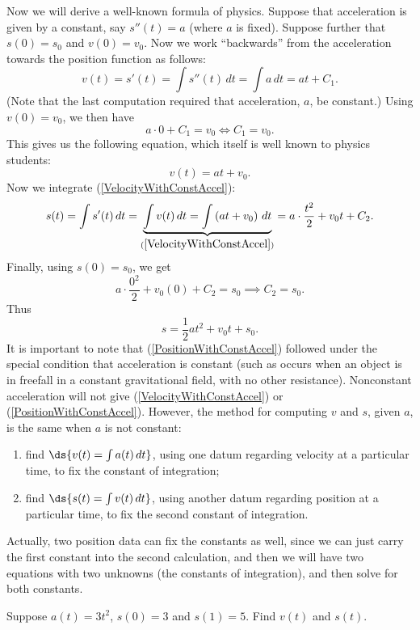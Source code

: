 Now we will derive a well-known formula of physics.
\bex Suppose that acceleration is given by a constant, 
say $s''(t)=a$ (where $a$ is fixed).  Suppose further
that $s(0)=s_0$ and $v(0)=v_0$.  Now we work ``backwards''
from the acceleration towards the position function as
follows:
$$v(t)=s'(t)=\int s''(t)\,dt=\int a\,dt=at+C_1.$$
(Note that the last computation required that acceleration, $a$, be constant.)
Using $v(0)=v_0$, we then have 
$$a\cdot0+C_1=v_0\iff C_1=v_0.$$
This gives us the following equation, which itself is well known
to physics students:
\begin{equation}v(t)=at+v_0.\label{VelocityWithConstAccel}\end{equation}
Now we integrate (\ref{VelocityWithConstAccel}):
$$s(t)=\int s'(t)\,dt=
\underbrace{\int v(t)\,dt=\int\left(at+v_0\right)\,dt}_{
(\ref{VelocityWithConstAccel})}
=a\cdot\frac{t^2}2+v_0t+C_2.$$
Finally, using $s(0)=s_0$, we get
$$a\cdot\frac{0^2}2+v_0(0)+C_2=s_0\implies C_2=s_0.$$
Thus
\begin{equation}s=\frac12at^2+v_0t+s_0.\label{PositionWithConstAccel}
\end{equation}
\eex
It is important to note that (\ref{PositionWithConstAccel})
followed under the special condition that acceleration is 
constant (such as occurs when an object is
in freefall in a constant gravitational field, with no other 
resistance).  Nonconstant acceleration will not give
(\ref{VelocityWithConstAccel}) or (\ref{PositionWithConstAccel}).
However, the method for computing $v$ and $s$, given $a$, is
the same when $a$ is not constant:
\begin{enumerate}
\item find $\ds{v(t)=\int a(t)\,dt}$, using one datum regarding velocity
      at a particular time, to fix the constant
       of integration;
\item find $\ds{s(t)=\int v(t)\,dt}$, using another datum regarding
      position at a particular time, to fix the
      second constant of integration.
\end{enumerate}
Actually, two position data can fix the constants as well, since
we can just carry the first constant into the second calculation,
and then we will have two equations with two unknowns (the
constants of integration), and then solve for both constants.

\bex Suppose $a(t)=3t^2$, $s(0)=3$ and $s(1)=5$.  Find $v(t)$ and 
$s(t)$.


